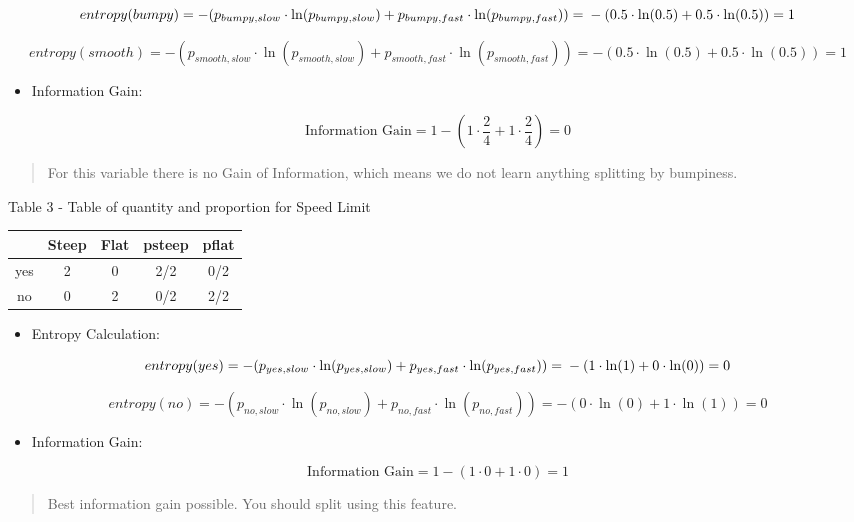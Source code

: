 \documentclass[]{book}
\providecommand{\tightlist}{%
  \setlength{\itemsep}{0pt}\setlength{\parskip}{0pt}}
\begin{document}
\[entropy(bumpy) = -(p_{bumpy,slow} \cdot \ln(p_{bumpy,slow}) + p_{bumpy,fast} \cdot \ln(p_{bumpy,fast})) = \\ -(0.5 \cdot \ln(0.5) + 0.5 \cdot \ln(0.5)) = 1 \]

\[entropy(smooth) = -(p_{smooth,slow} \cdot \ln(p_{smooth,slow}) + p_{smooth,fast} \cdot \ln(p_{smooth,fast})) = -(0.5 \cdot \ln(0.5) + 0.5 \cdot \ln(0.5)) = 1 \]

\begin{itemize}
\tightlist
\item
  Information Gain:
\end{itemize}

\[\text{Information Gain} = 1 - (1 \cdot \frac{2}{4} + 1 \cdot \frac{2}{4}) = 0\]

\begin{quote}
For this variable there is no Gain of Information, which means we do not
learn anything splitting by bumpiness.
\end{quote}

Table 3 - Table of quantity and proportion for Speed Limit

\begin{longtable}[]{@{}ccccc@{}}
\toprule
& Steep & Flat & psteep & pflat\tabularnewline
\midrule
\endhead
yes & 2 & 0 & 2/2 & 0/2\tabularnewline
no & 0 & 2 & 0/2 & 2/2\tabularnewline
\bottomrule
\end{longtable}

\begin{itemize}
\tightlist
\item
  Entropy Calculation:
\end{itemize}

\[entropy(yes) = -(p_{yes,slow} \cdot \ln(p_{yes,slow}) + p_{yes,fast} \cdot \ln(p_{yes,fast})) = \\ -(1 \cdot \ln(1) + 0 \cdot \ln(0)) = 0 \]

\[entropy(no) = -(p_{no,slow} \cdot \ln(p_{no,slow}) + p_{no,fast} \cdot \ln(p_{no,fast})) = -(0 \cdot \ln(0) + 1 \cdot \ln(1)) = 0 \]

\begin{itemize}
\tightlist
\item
  Information Gain:
\end{itemize}

\[\text{Information Gain} = 1 - (1 \cdot 0 + 1 \cdot 0) = 1\]

\begin{quote}
Best information gain possible. You should split using this feature.
\end{quote}
\end{document}
